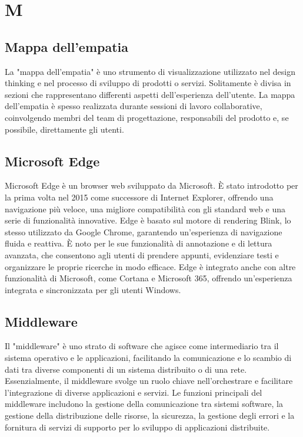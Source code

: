 \documentclass{article}
\begin{document}
\section{M}
\subsection {Mappa dell'empatia}
La "mappa dell'empatia" è uno strumento di visualizzazione utilizzato nel design thinking e nel processo di sviluppo di prodotti o servizi.
Solitamente è divisa in sezioni che rappresentano differenti aspetti dell'esperienza dell'utente.
La mappa dell'empatia è spesso realizzata durante sessioni di lavoro collaborative, coinvolgendo membri del team di progettazione, responsabili del prodotto e, se possibile, direttamente gli utenti.

\subsection{Microsoft Edge}
Microsoft Edge è un browser web sviluppato da Microsoft. È stato introdotto per la prima volta nel 2015 come successore di Internet Explorer, offrendo una navigazione più veloce, una migliore compatibilità con gli standard web e una serie di funzionalità innovative. Edge è basato sul motore di rendering Blink, lo stesso utilizzato da Google Chrome, garantendo un'esperienza di navigazione fluida e reattiva. È noto per le sue funzionalità di annotazione e di lettura avanzata, che consentono agli utenti di prendere appunti, evidenziare testi e organizzare le proprie ricerche in modo efficace. Edge è integrato anche con altre funzionalità di Microsoft, come Cortana e Microsoft 365, offrendo un'esperienza integrata e sincronizzata per gli utenti Windows.

\subsection{Middleware}
Il "middleware" è uno strato di software che agisce come intermediario tra il sistema operativo e le applicazioni, facilitando la comunicazione e lo scambio di dati tra diverse componenti di un sistema distribuito o di una rete. Essenzialmente, il middleware svolge un ruolo chiave nell'orchestrare e facilitare l'integrazione di diverse applicazioni e servizi. Le funzioni principali del middleware includono la gestione della comunicazione tra sistemi software, la gestione della distribuzione delle risorse, la sicurezza, la gestione degli errori e la fornitura di servizi di supporto per lo sviluppo di applicazioni distribuite.
\end{document}
